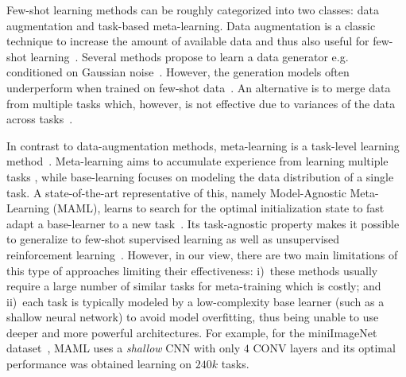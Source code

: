 Few-shot learning methods can be roughly categorized into two classes: data augmentation and task-based meta-learning.
%
Data augmentation is a classic technique to increase the amount of available data and thus also useful for few-shot learning~\cite{KhorevaBIBS17}.
Several methods propose to learn a data generator e.g. conditioned on Gaussian noise~\cite{Mehrotra2017, SchwartzNIPS18, WangCVPR2018}. 
However, the generation models often underperform when trained on few-shot data~\cite{BartunovV18}.
%
An alternative is to merge data from multiple tasks which, however, is not effective due to variances of the data across tasks~\cite{WangCVPR2018}.
%

In contrast to data-augmentation methods, meta-learning is a task-level learning method~\cite{Bengio92, Naik92, Thrun1998}.
Meta-learning aims to accumulate experience from learning multiple tasks \cite{FinnAL17, RaviICLR2017, SnellSZ17, MunkhdalaiICML2017, GrantICLR2018}, while base-learning focuses on modeling the data distribution of a single task. 
A state-of-the-art representative of this, namely 
Model-Agnostic Meta-Learning (MAML), learns to search for the optimal initialization state to fast adapt a base-learner to a new task~\cite{FinnAL17}.
%
Its task-agnostic property makes it possible to generalize to few-shot supervised learning as well as unsupervised reinforcement learning~\cite{GrantICLR2018, FinnNIPS2018}.
%
However, in our view, there are two main limitations of this type of approaches limiting their effectiveness: i)~these methods usually require a large number of similar tasks for meta-training which is costly; and ii)~each task is typically modeled by a low-complexity base learner (such as a shallow neural network) to avoid model overfitting, thus being unable to use deeper and more powerful architectures. 
%
%
For example, for the miniImageNet dataset~\cite{VinyalsBLKW16}, MAML uses a \emph{shallow} CNN with only $4$ CONV layers and its optimal performance was obtained learning on $240k$ tasks.


